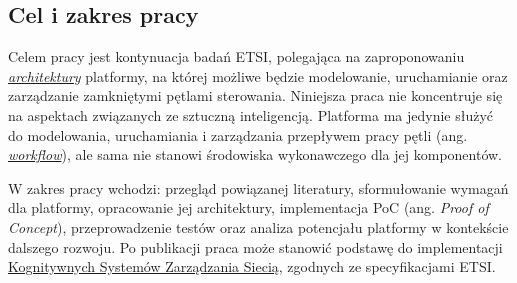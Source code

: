 \subsection{Cel i zakres pracy}

Celem pracy jest kontynuacja badań ETSI, polegająca na zaproponowaniu \hyperlink{def:architektura}{\textit{architektury}} platformy, na której możliwe będzie modelowanie, uruchamianie oraz zarządzanie zamkniętymi pętlami sterowania. Niniejsza praca nie koncentruje się na aspektach związanych ze sztuczną inteligencją. Platforma ma jedynie służyć do modelowania, uruchamiania i zarządzania przepływem pracy pętli (ang. \hyperlink{def:workflow}{\textit{workflow}}), ale sama nie stanowi środowiska wykonawczego dla jej komponentów.

W zakres pracy wchodzi: przegląd powiązanej literatury, sformułowanie wymagań dla platformy, opracowanie jej architektury, implementacja PoC (ang. \textit{Proof of Concept}), przeprowadzenie testów oraz analiza potencjału platformy w kontekście dalszego rozwoju. Po publikacji praca może stanowić podstawę do implementacji \hyperlink{def:kognitywny-system-zarzadzania-siecia}{Kognitywnych Systemów Zarządzania Siecią}, zgodnych ze specyfikacjami ETSI.

